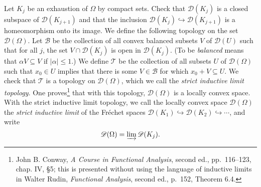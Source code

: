 \documentclass{article}
\begin{document}
Let $K_j$ be an exhaustion of $\Omega$ by compact sets. 
Check that
$\mathscr{D}(K_j)$ is a closed subspace of $\mathscr{D}(K_{j+1})$ and that the inclusion $\mathscr{D}(K_j) \hookrightarrow \mathscr{D}(K_{j+1})$ is a 
homeomorphism onto its image. 
 We define the following topology on the set $\mathscr{D}(\Omega)$. Let $\mathscr{B}$ be 
the collection of all convex balanced 
subsets $V$ of $\mathscr{D}(U)$ such that
for all $j$, the set $V \cap \mathscr{D}(K_j)$ is open in $\mathscr{D}(K_j)$.
  (To be {\em balanced} means that 
$\alpha V \subseteq V$ if $|\alpha| \leq 1$.) We define $\mathscr{T}$ be the collection of all subsets $U$ of
$\mathscr{D}(\Omega)$ such that $x_0 \in U$ implies that there is some $V \in \mathscr{B}$ for which
$x_0+V \subseteq U$. We check that $\mathscr{T}$ is a topology on $\mathscr{D}(\Omega)$, which we call the {\em strict inductive
limit topology}. One proves\footnote{John B. Conway, {\em A Course in Functional Analysis}, second ed., pp.~116--123, chap. IV, \S 5; this is presented without
using the language of inductive limits in Walter Rudin, {\em Functional Analysis}, second ed., p.~152, Theorem 6.4.} that with this topology, $\mathscr{D}(\Omega)$ is a locally convex space. With the strict inductive limit topology, we call the locally convex space
$\mathscr{D}(\Omega)$ the {\em strict inductive limit} of the Fr\'echet spaces
$\mathscr{D}(K_1) \hookrightarrow \mathscr{D}(K_2) \hookrightarrow \cdots$, and write
\[
\mathscr{D}(\Omega)=\varinjlim \mathscr{D}(K_j).
\]
\end{document}
